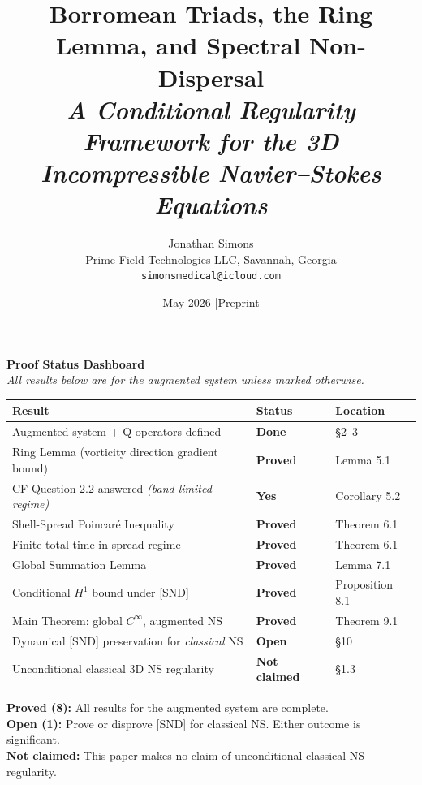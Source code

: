 \documentclass[11pt]{article}
\title{\textbf{Borromean Triads, the Ring Lemma, and Spectral Non-Dispersal}\\[6pt]
\large\textit{A Conditional Regularity Framework for the 3D Incompressible Navier--Stokes Equations}}
\author{Jonathan Simons\\
Prime Field Technologies LLC, Savannah, Georgia\\
\texttt{simonsmedical@icloud.com}}
\date{May 2026 \quad|\quad Preprint}
\begin{document}
\maketitle

\begin{mdframed}[
  linecolor=darkblue, linewidth=1.5pt, backgroundcolor=white,
  innertopmargin=10pt, innerbottommargin=10pt,
  innerleftmargin=12pt, innerrightmargin=12pt
]
{\large\textbf{\color{darkblue} Proof Status Dashboard}}\\[6pt]
{\small\textit{All results below are for the augmented system unless marked otherwise.}}\\[8pt]
\begin{tabular}{>{\raggedright\arraybackslash}p{7.8cm} >{\centering\arraybackslash}p{2.5cm} >{\raggedright\arraybackslash}p{3.5cm}}
\toprule
\textbf{Result} & \textbf{Status} & \textbf{Location} \\
\midrule
\rowcolor{lightgreen}
Augmented system + Q-operators defined & \textcolor{proved}{\textbf{Done}} & \S2--3 \\
\rowcolor{lightgreen}
Ring Lemma (vorticity direction gradient bound) & \textcolor{proved}{\textbf{Proved}} & Lemma 5.1 \\
\rowcolor{lightgreen}
CF Question 2.2 answered \emph{(band-limited regime)} & \textcolor{proved}{\textbf{Yes}} & Corollary 5.2 \\
\rowcolor{lightgreen}
Shell-Spread Poincar\'e Inequality & \textcolor{proved}{\textbf{Proved}} & Theorem 6.1 \\
\rowcolor{lightgreen}
Finite total time in spread regime & \textcolor{proved}{\textbf{Proved}} & Theorem 6.1 \\
\rowcolor{lightgreen}
Global Summation Lemma & \textcolor{proved}{\textbf{Proved}} & Lemma 7.1 \\
\rowcolor{lightgreen}
Conditional $H^1$ bound under [SND] & \textcolor{proved}{\textbf{Proved}} & Proposition 8.1 \\
\rowcolor{lightgreen}
Main Theorem: global $C^\infty$, augmented NS & \textcolor{proved}{\textbf{Proved}} & Theorem 9.1 \\
\midrule
\rowcolor{lightred}
Dynamical [SND] preservation for \emph{classical} NS & \textcolor{open}{\textbf{Open}} & \S10 \\
\rowcolor{lightgray}
Unconditional classical 3D NS regularity & \textcolor{notclaimed}{\textbf{Not claimed}} & \S1.3 \\
\bottomrule
\end{tabular}
\vspace{8pt}
{\small
\textbf{\color{proved}Proved (8):} All results for the augmented system are complete.\\[4pt]
\textbf{\color{open}Open (1):} Prove or disprove [SND] for classical NS. Either outcome is significant.\\[4pt]
\textbf{\color{notclaimed}Not claimed:} This paper makes no claim of unconditional classical NS regularity.
}
\end{mdframed}
\end{document}
